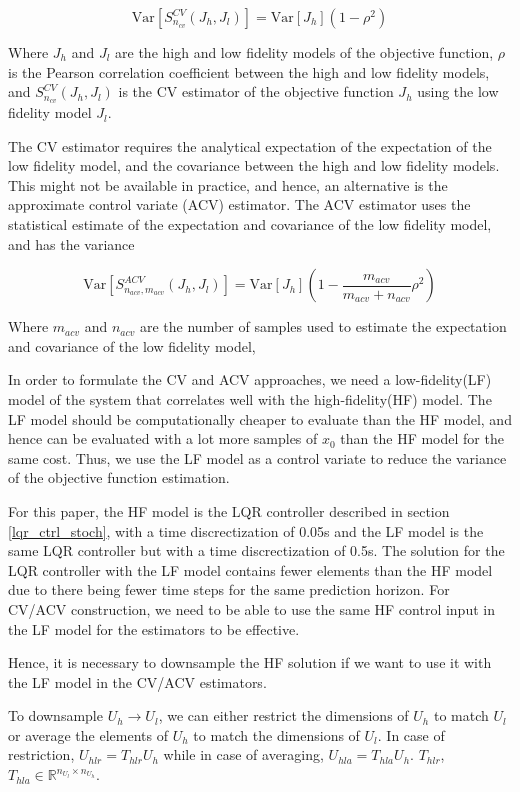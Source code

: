 \documentclass{article}
\begin{document}
$$
\text{Var}[S_{n_{cv}}^{CV}(J_h, J_l)] = \text{Var}[J_h] (1 - \rho^2)
$$

Where $J_h$ and $J_l$ are the high and low fidelity models of the objective function, $\rho$ is the Pearson correlation
coefficient between the high and low fidelity models, and $S_{n_{cv}}^{CV}(J_h, J_l)$ is the CV estimator of the objective
function $J_h$ using the low fidelity model $J_l$.

The CV estimator requires the analytical expectation of the expectation of the low fidelity model, and the covariance between
the high and low fidelity models. This might not be available in practice, and hence, an alternative is the approximate
control variate (ACV) estimator. The ACV estimator uses the statistical estimate of the expectation and covariance
of the low fidelity model, and has the variance

$$
\text{Var}[S_{n_{acv},m_{acv}}^{ACV}(J_h, J_l)] = \text{Var}[J_h] (1 - \frac{m_{acv}}{m_{acv} + n_{acv}} \rho^2)
$$

Where $m_{acv}$ and $n_{acv}$ are the number of samples used to estimate the expectation and covariance of the low fidelity model,

In order to formulate the CV and ACV approaches, we need a low-fidelity(LF) model of the system that correlates well
with the high-fidelity(HF) model. The LF model should be computationally cheaper to evaluate than the
HF model, and hence can be evaluated with a lot more samples of $x_0$ than the HF model for the same cost.
Thus, we use the LF model as a control variate to reduce the variance of the objective function
estimation.

For this paper, the HF model is the LQR controller described in section \ref{lqr_ctrl_stoch}, with a time
discrectization of 0.05s and the LF model is the same LQR controller but with a time discrectization of 0.5s.
The solution for the LQR controller with the LF model contains fewer elements than the HF model due to there being
fewer time steps for the same prediction horizon. For CV/ACV construction, we need to be able to use the same
HF control input in the LF model for the estimators to be effective.

Hence, it is necessary to downsample the HF solution if we want to use it with the LF model in the CV/ACV estimators.

To downsample $U_h \rightarrow U_l$, we can either restrict the dimensions of $U_h$ to match $U_l$ or average the elements of $U_h$ to match the dimensions of $U_l$.
In case of restriction, $U_{hlr} = T_{hlr} U_h$ while in case of averaging, $U_{hla} = T_{hla} U_h$.
$T_{hlr}$, $T_{hla} \in \mathbb{R}^{n_{U_l} \times n_{U_h}}$.
\end{document}
